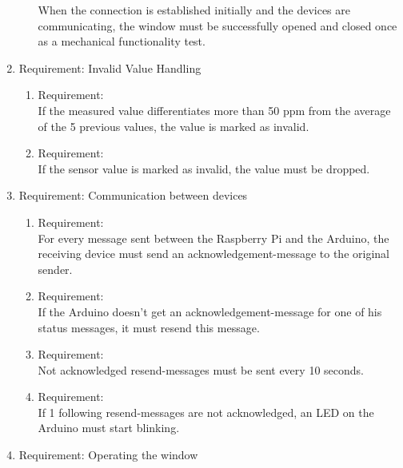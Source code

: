 \begin{enumerate}[label*=\arabic*.]
\begin{enumerate}[label*=\arabic*.]
            When the connection is established initially and the devices are communicating, the window must be successfully opened and closed once as a mechanical functionality test.\\
		\end{enumerate}
		\item \label{req.2}  Requirement:  Invalid Value Handling\\
  	\begin{enumerate}[label*=\arabic*.]
   		\item \label{req.2.2}  Requirement:  \\
			If the measured value differentiates more than 50 ppm from the average of the 5 previous values, the value is marked as invalid.\\
   		\item \label{req.2.3}  Requirement:  \\
			If the sensor value is marked as invalid, the value must be dropped.\\
	  \end{enumerate}
		\item \label{req.3}  Requirement:   Communication between devices  \\
  	\begin{enumerate}[label*=\arabic*.]
			\item \label{req.3.1}  Requirement:  \\
			  For every message sent between the Raspberry Pi and the Arduino, the receiving device must send an acknowledgement-message to the original sender.\\
   		\item \label{req.3.2}  Requirement:  \\
			If the Arduino doesn't get an acknowledgement-message for one of his status messages, it must resend this message.\\
   		\item \label{req.3.3}  Requirement:  \\
			Not acknowledged resend-messages must be sent every 10 seconds.\\
   		\item \label{req.3.4}  Requirement:  \\
			If 1 following resend-messages are not acknowledged, an LED on the Arduino must start blinking.\\ 
	  \end{enumerate}  
        \item \label{req.4}  Requirement: Operating the window \\

\end{enumerate}
